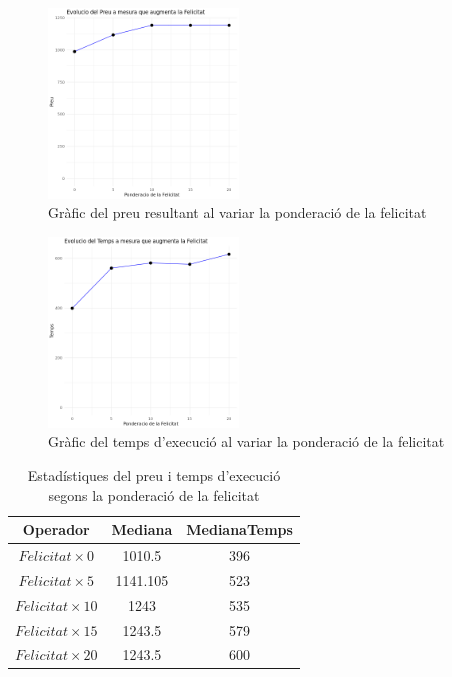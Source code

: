 \documentclass[a4paper]{article}
\begin{document}
	\begin{figure}[H]
		\centering
		\includegraphics[width=0.45\textwidth]{images/exp6_grafic.png}
		\caption{Gràfic del preu resultant al variar la ponderació de la felicitat}
		\label{fig:exp6a_grafic}
	\end{figure}
	
	\begin{figure}[H]
		\centering
		\includegraphics[width=0.45\textwidth]{images/exp6b_grafic.png}
		\caption{Gràfic del temps d'execució al variar la ponderació de la felicitat}
		\label{fig:exp6b_grafic}
	\end{figure}
	
	\begin{table}[H]
		\centering
		\begin{tabular}{|c|c|c|}
			\hline
			\textbf{Operador} & \textbf{Mediana} & \textbf{MedianaTemps} \\
			\hline
			$Felicitat \times 0$ & 1010.5 & 396\\
			\hline
			$Felicitat \times 5$ & 1141.105 & 523\\
			\hline
			$Felicitat \times 10$ & 1243 & 535\\
			\hline
			$Felicitat \times 15$ & 1243.5 & 579\\
			\hline
			$Felicitat \times 20$ & 1243.5 & 600\\
			\hline
		\end{tabular}
		\caption{Estadístiques del preu i temps d'execució segons la ponderació de la felicitat}
		\label{tab:exp6_estadisticas}
	\end{table}
	
\end{document}

